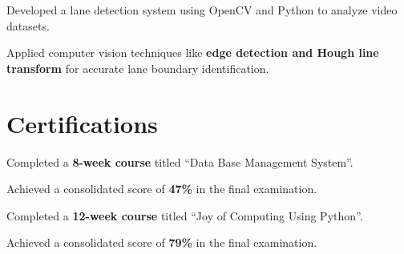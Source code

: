 \documentclass[14pt]{deedy-resume-openfont}
\begin{document}
\begin{minipage}[t]{0.66\textwidth}

    \begin{tightemize}
        \item Developed a lane detection system using OpenCV and Python to analyze video datasets.
        \item Applied computer vision techniques like {\bf edge detection and Hough line transform} for accurate lane boundary identification.
    \end{tightemize}
    \sectionsep




    \section{Certifications}


    \begin{tightemize}
        \item Completed a {\bf 8-week course} titled ``Data Base Management System''.
        \item Achieved a consolidated score of \textbf{47\%} in the final examination.
    \end{tightemize}
    \sectionsep


    \begin{tightemize}
        \item Completed a {\bf 12-week course} titled ``Joy of Computing Using Python''.
        \item Achieved a consolidated score of \textbf{79\%} in the final examination.
    \end{tightemize}
    \sectionsep


\end{minipage}
\end{document}
